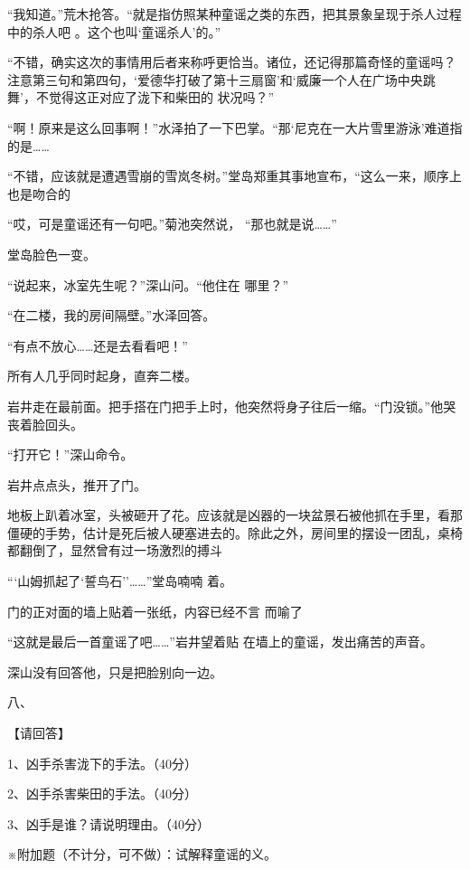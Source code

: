 \documentclass{article}
\begin{document}
“我知道。”荒木抢答。“就是指仿照某种童谣之类的东西，把其景象呈现于杀人过程中的杀人吧
。这个也叫‘童谣杀人’的。” 

“不错，确实这次的事情用后者来称呼更恰当。诸位，还记得那篇奇怪的童谣吗？注意第三句和第四句，‘爱德华打破了第十三扇窗’和‘威廉一个人在广场中央跳舞’，不觉得这正对应了泷下和柴田的
状况吗？” 

“啊！原来是这么回事啊！”水泽拍了一下巴掌。“那‘尼克在一大片雪里游泳’难道指的是……

“不错，应该就是遭遇雪崩的雪岚冬树。”堂岛郑重其事地宣布，“这么一来，顺序上也是吻合的

“哎，可是童谣还有一句吧。”菊池突然说，
“那也就是说……” 


\newpage

堂岛脸色一变。 

“说起来，冰室先生呢？”深山问。“他住在
哪里？” 


“在二楼，我的房间隔壁。”水泽回答。 


“有点不放心……还是去看看吧！” 


所有人几乎同时起身，直奔二楼。 

岩井走在最前面。把手搭在门把手上时，他突然将身子往后一缩。“门没锁。”他哭丧着脸回头。


“打开它！”深山命令。 


岩井点点头，推开了门。 

地板上趴着冰室，头被砸开了花。应该就是凶器的一块盆景石被他抓在手里，看那僵硬的手势，估计是死后被人硬塞进去的。除此之外，房间里的摆设一团乱，桌椅都翻倒了，显然曾有过一场激烈的搏斗
\newpage


“‘山姆抓起了‘誓鸟石’’……”堂岛喃喃
着。 

门的正对面的墙上贴着一张纸，内容已经不言
而喻了 

“这就是最后一首童谣了吧……”岩井望着贴
在墙上的童谣，发出痛苦的声音。 


深山没有回答他，只是把脸别向一边。 


八、 


【请回答】 


1、凶手杀害泷下的手法。（40分） 


2、凶手杀害柴田的手法。（40分） 


\newpage

3、凶手是谁？请说明理由。（40分） 

※附加题（不计分，可不做）：试解释童谣的义。
\end{document}
